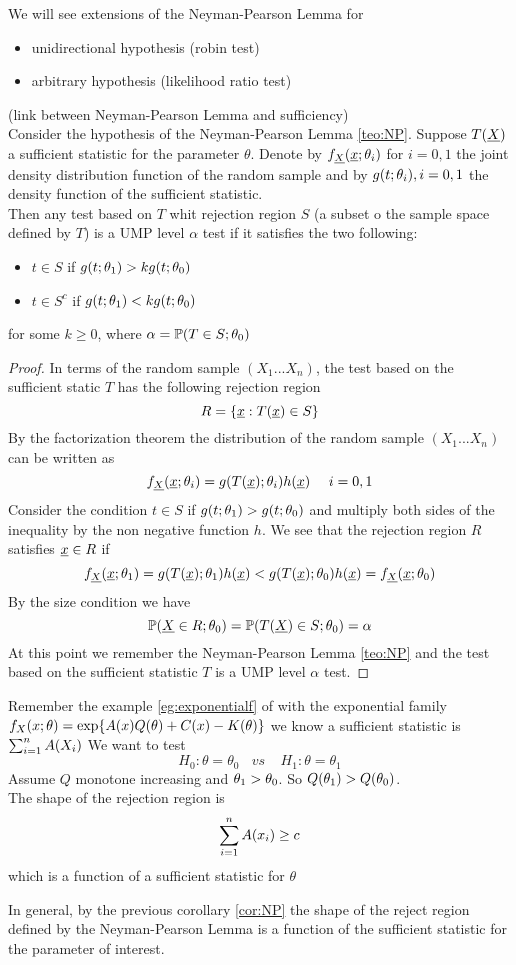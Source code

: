 We will see extensions of the Neyman-Pearson Lemma for
\begin{itemize}
	\item unidirectional hypothesis (robin test)
	\item arbitrary hypothesis (likelihood ratio test)
\end{itemize}
\begin{corol}\label{cor:NP}
	(link between Neyman-Pearson Lemma and sufficiency)\\
	Consider the hypothesis of the Neyman-Pearson Lemma \ref{teo:NP}. Suppose $T(\underline X) $ a sufficient statistic for the parameter $\theta$. Denote by $f_{\underline X}(\underline x; \theta_i) $ for $i=0,1$ the joint density distribution function of the random sample and by $g(t;\theta_i), i=0,1$ the density function of the sufficient statistic.\\
	Then any test based on $T$ whit rejection region $S$ (a subset o the sample space defined by $T$) is a UMP level  $\alpha$ test if it satisfies the two following:
	\begin{itemize}
		\item $t\in S$ if $g(t;\theta_1)>k g(t;\theta_0)$
		\item $t\in S^c$ if $g(t;\theta_1)< k g(t; \theta_0)$
	\end{itemize}  
	for some $k \geq 0$, where $\alpha = \mathbb{P}(T\in S; \theta_0)$
\end{corol}
\begin{proof}
	In terms of the random sample $(X_1...X_n)$, the test based on the sufficient static  $T$ has the following rejection region $$R=\{\underline x : T(\underline x) \in S\}$$
	By the factorization theorem the distribution of the random sample  $(X_1...X_n)$ can be written as 
	$$f_{\uX}(\ux;\te_i)=g(T(\ux);\te_i)h(\ux) \ \ \ \ i=0,1$$
	Consider the condition $t\in S$ if $g(t;\theta_1)> g(t;\theta_0)$ and multiply both sides of the inequality by the non negative function $h$. We see that the rejection region $R$ satisfies $\underline x\in R$ if 
	$$f_{\underline X}(\underline x;\theta_1)=g(T(\underline x);\theta_1)h(\underline x)< g(T(\underline x);\theta_0)h(\underline x)=f_{\underline X}(\underline x;\theta_0)$$
	By the size condition we have
	$$	\mathbb{P} (\underline X \in R; \theta_0)=\mathbb{P}(T(\underline X)\in S; \theta_0)=\alpha$$
	At this point we remember the Neyman-Pearson Lemma \ref{teo:NP} and the test based on the  sufficient statistic $T$ is a UMP level $\alpha$ test.
\end{proof}
\begin{eg}Remember the example \ref{eg:exponentialf} of with the exponential family
	$f_X(x;\theta)=\exp \{ A(x) Q(\theta)+ C(x)- K(\theta) \}$ we know a sufficient statistic is $\sum_{i=1}^n A(X_i)$
	We want to test 
	$$H_0: \theta= \theta_0 \ \ \ \ vs\ \ \ \ \ H_1: \theta= \theta_1 $$
	Assume $Q$ monotone increasing and $\theta_1>\theta_0$. So $Q(\theta_1)> Q(\theta_0)$.\\
	The shape of the rejection region is 
	$$\sum_{i=1}^n A(x_i)\geq c$$
	which is a   function of a sufficient statistic for $\theta$
\end{eg}
In general, by the previous corollary \ref{cor:NP} the shape of the reject region defined by the Neyman-Pearson Lemma is a function of the sufficient statistic for the parameter of interest.